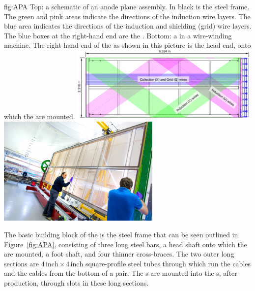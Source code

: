 \begin{dunefigure}{fig:APA}
{Top: a schematic of an anode plane assembly. In black is the steel  frame. The green and pink areas indicate the directions of the induction wire layers. The blue area indicates the directions of the induction and shielding (grid) wire layers. The blue boxes at the right-hand end  are the . Bottom: a   in a wire-winding machine. The right-hand end of the  as shown in this picture is the head end, onto which the  are mounted.}
\includegraphics[width=0.7\textwidth]{graphics/APASchematic.pdf}
\includegraphics[width=0.6\textwidth]{graphics/RealAPA.pdf}
\end{dunefigure}

The basic building block of the  is the steel frame that can be seen outlined in Figure~\ref{fig:APA}, consisting of three long steel bars, a head shaft onto which the  are mounted, a foot shaft, and four thinner cross-braces. The two outer long sections are $4\,\mathrm{inch}\times 4\,\mathrm{inch}$ square-profile steel tubes through which run the  cables and the  cables from the bottom  of a pair. The s are mounted into the s, after production, through slots in these long sections.


